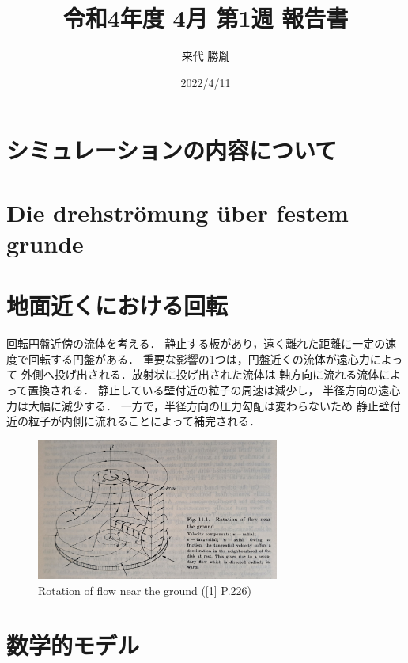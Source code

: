 \documentclass[twocolumn,a4j]{jsarticle}
\author{来代 勝胤}
\title{令和4年度 4月 第1週 報告書}
\date{2022/4/11}
\begin{document}
\columnseprule=0.1mm
\maketitle

\section*{シミュレーションの内容について}

\section*{Die drehstr\"{o}mung \"{u}ber festem grunde}

\section{地面近くにおける回転}

回転円盤近傍の流体を考える．
静止する板があり，遠く離れた距離に一定の速度で回転する円盤がある．
重要な影響の1つは，円盤近くの流体が遠心力によって
外側へ投げ出される．放射状に投げ出された流体は
軸方向に流れる流体によって置換される．
静止している壁付近の粒子の周速は減少し，
半径方向の遠心力は大幅に減少する．
一方で，半径方向の圧力勾配は変わらないため
静止壁付近の粒子が内側に流れることによって補完される．

\begin{figure}[htbp]
  \footnotesize
  \begin{center}
    \includegraphics[width=80mm]{../images/Boundary-Layer_Theory_Fig.11.1.jpg}
    \caption{Rotation of flow near the ground ([1] P.226)}
  \end{center}
\end{figure}

\section{数学的モデル}
\end{document}
